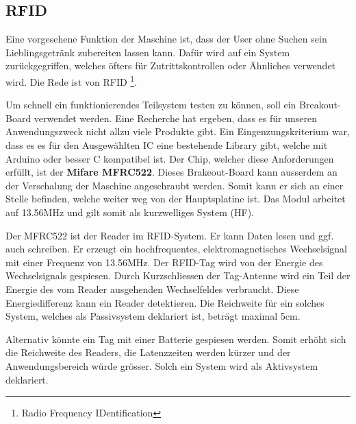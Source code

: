 \subsection{RFID}
\label{subsec:RFID}

Eine vorgesehene Funktion der Maschine ist, dass der User ohne Suchen sein Lieblingsgetränk zubereiten lassen kann. Dafür wird auf ein System zurückgegriffen, welches öfters für Zutrittskontrollen oder Ähnliches verwendet wird. Die Rede ist von RFID \footnote{Radio Frequency IDentification}.

Um schnell ein funktionierendes Teilsystem testen zu können, soll ein Breakout-Board verwendet werden. Eine Recherche hat ergeben, dass es für unseren Anwendungszweck nicht allzu viele Produkte gibt. Ein Eingenzungskriterium war, dass es es für den Ausgewählten IC eine bestehende Library gibt, welche mit Arduino oder besser C kompatibel ist. Der Chip, welcher diese Anforderungen erfüllt, ist der \textbf{Mifare MFRC522}. Dieses Brakeout-Board kann ausserdem an der Verschalung der Maschine angeschraubt werden. Somit kann er sich an einer Stelle befinden, welche weiter weg von der Hauptsplatine ist.
Das Modul arbeitet auf 13.56MHz und gilt somit als kurzwelliges System (HF).

Der MFRC522 ist der Reader im RFID-System. Er kann Daten lesen und ggf. auch schreiben. Er erzeugt ein hochfrequentes, elektromagnetisches Wechselsignal mit einer Frequenz von 13.56MHz. Der RFID-Tag wird von der Energie des Wechselsignals gespiesen. Durch Kurzschliessen der Tag-Antenne wird ein Teil der Energie des vom Reader ausgehenden Wechselfeldes verbraucht. Diese Energiedifferenz kann ein Reader detektieren. Die Reichweite für ein solches System, welches als Passivsystem deklariert ist, beträgt maximal 5cm.

Alternativ könnte ein Tag mit einer Batterie gespiesen werden. Somit erhöht sich die Reichweite des Readers, die Latenzzeiten werden kürzer und der Anwendungsbereich würde grösser. Solch ein System wird als Aktivsystem deklariert.


